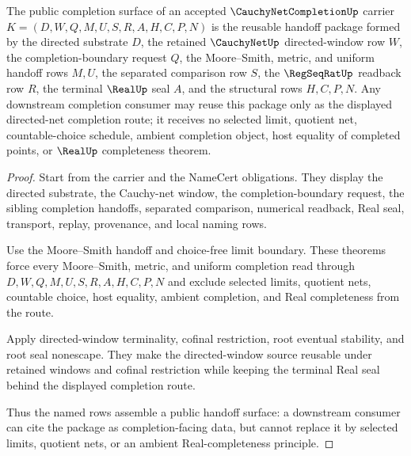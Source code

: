 \begin{theorem}
\label{thm:cauchynetcompletion-public-handoff}
The public completion surface of an accepted $\CauchyNetCompletionUp$ carrier $K=(D,W,Q,M,U,S,R,A,H,C,P,N)$ is the reusable handoff package formed by the directed substrate $D$, the retained $\CauchyNetUp$ directed-window row $W$, the completion-boundary request $Q$, the Moore--Smith, metric, and uniform handoff rows $M,U$, the separated comparison row $S$, the $\RegSeqRatUp$ readback row $R$, the terminal $\RealUp$ seal $A$, and the structural rows $H,C,P,N$. Any downstream completion consumer may reuse this package only as the displayed directed-net completion route; it receives no selected limit, quotient net, countable-choice schedule, ambient completion object, host equality of completed points, or $\RealUp$ completeness theorem.
\end{theorem}
\begin{proof}
Start from the carrier and the NameCert obligations. They display the directed substrate, the Cauchy-net window, the completion-boundary request, the sibling completion handoffs, separated comparison, numerical readback, Real seal, transport, replay, provenance, and local naming rows.

Use the Moore--Smith handoff and choice-free limit boundary. These theorems force every Moore--Smith, metric, and uniform completion read through $D,W,Q,M,U,S,R,A,H,C,P,N$ and exclude selected limits, quotient nets, countable choice, host equality, ambient completion, and Real completeness from the route.

Apply directed-window terminality, cofinal restriction, root eventual stability, and root seal nonescape. They make the directed-window source reusable under retained windows and cofinal restriction while keeping the terminal Real seal behind the displayed completion route.

Thus the named rows assemble a public handoff surface: a downstream consumer can cite the package as completion-facing data, but cannot replace it by selected limits, quotient nets, or an ambient Real-completeness principle.
\end{proof}

